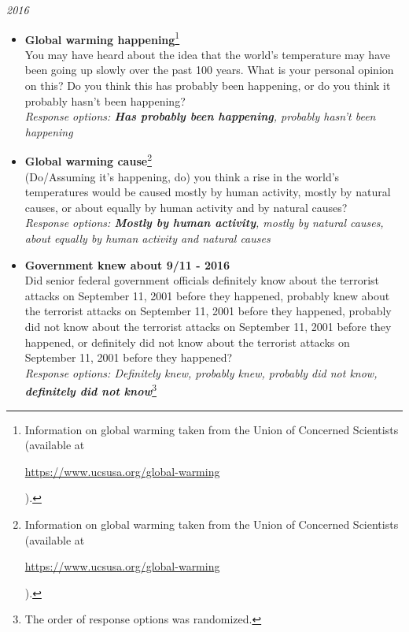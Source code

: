 \documentclass[12pt, letterpaper]{article}
\begin{document}
\large \noindent\textit{2016}

\normalsize
\begin{itemize}
\item \textbf{Global warming happening}\footnote{Information on global warming taken from the Union of Concerned Scientists (available at \begin{footnotesize}\url{https://www.ucsusa.org/global-warming}\end{footnotesize}).} \\
You may have heard about the idea that the world's temperature may have been going up slowly over the past 100 years. What is your personal opinion on this? Do you think this has probably been happening, or do you think it probably hasn't been happening?      \\     
\textit{Response options: \textbf{Has probably been happening}, probably hasn't been happening} \\
\end{itemize}

\normalsize
\begin{itemize}
\item \textbf{Global warming cause}\footnote{Information on global warming taken from the Union of Concerned Scientists (available at \begin{footnotesize}\url{https://www.ucsusa.org/global-warming}\end{footnotesize}).} \\
(Do/Assuming it's happening, do) you think a rise in the world's temperatures would be caused mostly by human activity, mostly by natural causes, or about equally by human activity and by natural causes?  \\     
\textit{Response options: \textbf{Mostly by human activity}, mostly by natural causes, about equally by human activity and natural causes} \\
\end{itemize}

\normalsize
\begin{itemize}
\item \textbf{Government knew about 9/11 - 2016} \\
Did senior federal government officials definitely know about the terrorist attacks on September 11, 2001 before they happened, probably knew about the terrorist attacks on September 11, 2001 before they happened, probably did not know about the terrorist attacks on September 11, 2001 before they happened, or definitely did not know about the terrorist attacks on September 11, 2001 before they happened?  \\     
\textit{Response options: Definitely knew, probably knew, probably did not know, \textbf{definitely did not know}}\footnote{The order of response options was randomized.} \\
\end{itemize}
\end{document}
